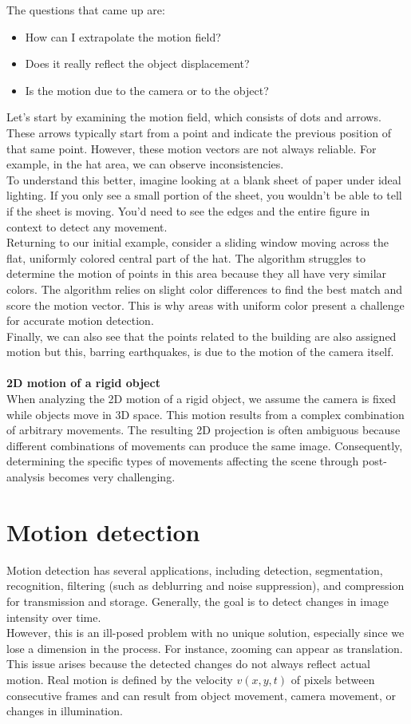 The questions that came up are:
\begin{itemize}
    \item How can I extrapolate the motion field?
    \item Does it really reflect the object displacement?
    \item Is the motion due to the camera or to the object?
\end{itemize}
Let's start by examining the motion field, which consists of dots and arrows. 
These arrows typically start from a point and indicate the previous position of that same point. 
However, these motion vectors are not always reliable. For example, in the hat area, we can observe inconsistencies.
\\
To understand this better, imagine looking at a blank sheet of paper under ideal lighting. 
If you only see a small portion of the sheet, you wouldn't be able to tell if the sheet is moving. 
You'd need to see the edges and the entire figure in context to detect any movement.
\\
Returning to our initial example, consider a sliding window moving across the flat, uniformly colored central part of the hat. 
The algorithm struggles to determine the motion of points in this area because they all have very similar colors. 
The algorithm relies on slight color differences to find the best match and score the motion vector. 
This is why areas with uniform color present a challenge for accurate motion detection.
\\
Finally, we can also see that the points related to the building are also assigned motion but this, barring earthquakes, is due to the motion of the camera itself.
\\\\\textbf{2D motion of a rigid object}
\\When analyzing the 2D motion of a rigid object, we assume the camera is fixed while objects move in 3D space. 
This motion results from a complex combination of arbitrary movements. 
The resulting 2D projection is often ambiguous because different combinations of movements can produce the same image. 
Consequently, determining the specific types of movements affecting the scene through post-analysis becomes very challenging.
\section{Motion detection}
Motion detection has several applications, including detection, segmentation, recognition, filtering (such as deblurring and noise suppression), and compression for transmission and storage. 
Generally, the goal is to detect changes in image intensity over time.
\\
However, this is an ill-posed problem with no unique solution, especially since we lose a dimension in the process. 
For instance, zooming can appear as translation. 
This issue arises because the detected changes do not always reflect actual motion. 
Real motion is defined by the velocity $v(x,y,t)$ of pixels between consecutive frames and can result from object movement, camera movement, or changes in illumination.
